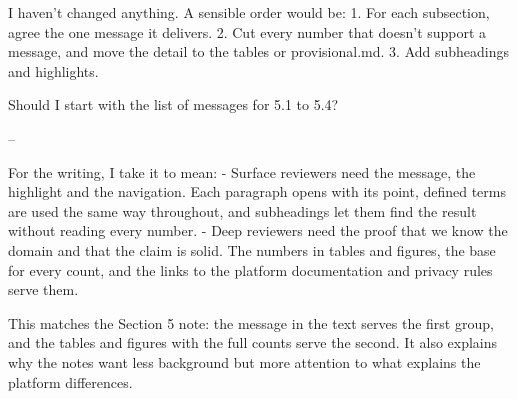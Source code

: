 I haven't changed anything. A sensible order would be:
1. For each subsection, agree the one message it delivers.
2. Cut every number that doesn't support a message, and move the detail to the tables or provisional.md.
3. Add subheadings and highlights.

Should I start with the list of messages for 5.1 to 5.4?


--



For the writing, I take it to mean:
- Surface reviewers need the message, the highlight and the navigation. Each paragraph opens with its point, defined terms are used the same way throughout, and subheadings let them find the result without reading every number.
- Deep reviewers need the proof that we know the domain and that the claim is solid. The numbers in tables and figures, the base for every count, and the links to the platform documentation and privacy rules serve them.

This matches the Section 5 note: the message in the text serves the first group, and the tables and figures with the full counts serve the second. It also explains why the notes want less background but more attention to what explains the platform differences.
